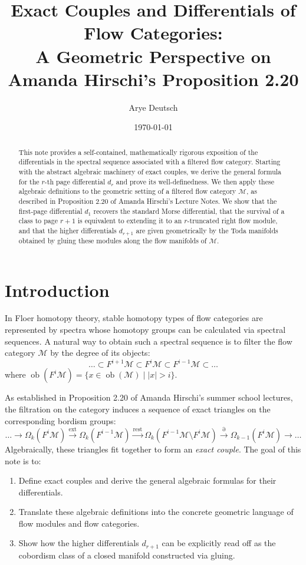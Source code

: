 \documentclass[a4paper,11pt]{article}
\date{\today}
\title{Exact Couples and Differentials of Flow Categories:\\A Geometric Perspective on Amanda Hirschi's Proposition 2.20}
\author{Arye Deutsch}
\theoremstyle{plain}
\theoremstyle{definition}
\theoremstyle{remark}
\newcommand{\flowM}{\mathcal{M}}
\newcommand{\ob}{\operatorname{ob}}
\begin{document}
\maketitle

\begin{abstract}
This note provides a self-contained, mathematically rigorous exposition of the differentials in the spectral sequence associated with a filtered flow category. Starting with the abstract algebraic machinery of exact couples, we derive the general formula for the $r$-th page differential $d_r$ and prove its well-definedness. We then apply these algebraic definitions to the geometric setting of a filtered flow category $\flowM$, as described in Proposition 2.20 of Amanda Hirschi's Lecture Notes. We show that the first-page differential $d_1$ recovers the standard Morse differential, that the survival of a class to page $r+1$ is equivalent to extending it to an $r$-truncated right flow module, and that the higher differentials $d_{r+1}$ are given geometrically by the Toda manifolds obtained by gluing these modules along the flow manifolds of $\flowM$.
\end{abstract}

\tableofcontents
\newpage

\section{Introduction}

In Floer homotopy theory, stable homotopy types of flow categories are represented by spectra whose homotopy groups can be calculated via spectral sequences. A natural way to obtain such a spectral sequence is to filter the flow category $\flowM$ by the degree of its objects:
\[
\dots \subset F^{i+1} \flowM \subset F^i \flowM \subset F^{i-1} \flowM \subset \dots
\]
where $\ob(F^i \flowM) = \{x \in \ob(\flowM) \mid |x| > i\}$. 

As established in Proposition 2.20 of Amanda Hirschi's summer school lectures, the filtration on the category induces a sequence of exact triangles on the corresponding bordism groups:
\[
\dots \to \Omega_k(F^i \flowM) \xrightarrow{\text{ext}} \Omega_k(F^{i-1} \flowM) \xrightarrow{\text{rest}} \Omega_k(F^{i-1}\flowM \setminus F^i \flowM) \xrightarrow{\partial} \Omega_{k-1}(F^i \flowM) \to \dots
\]
Algebraically, these triangles fit together to form an \emph{exact couple}. The goal of this note is to:
\begin{enumerate}
    \item Define exact couples and derive the general algebraic formulas for their differentials.
    \item Translate these algebraic definitions into the concrete geometric language of flow modules and flow categories.
    \item Show how the higher differentials $d_{r+1}$ can be explicitly read off as the cobordism class of a closed manifold constructed via gluing.
\end{enumerate}
\end{document}

